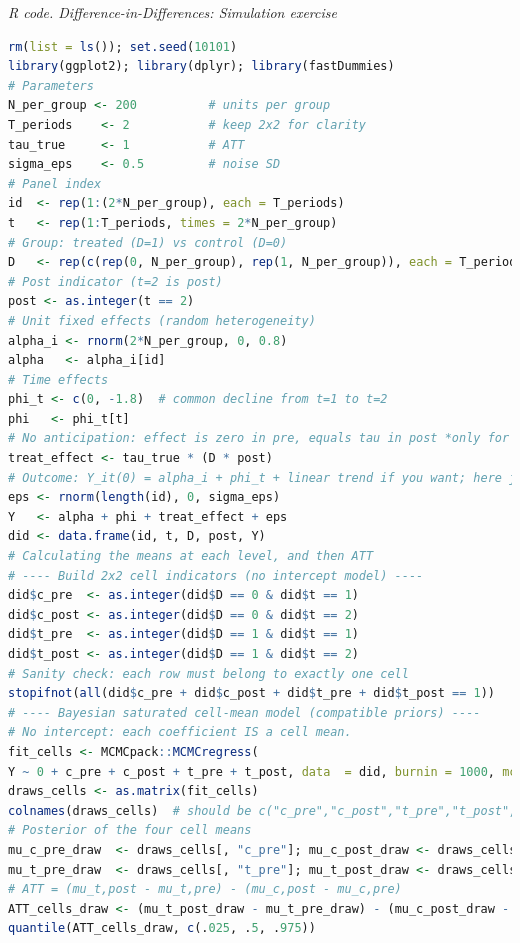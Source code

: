 \begin{enumerate}[leftmargin=*]
\begin{tcolorbox}[enhanced,width=4.67in,center upper,
	fontupper=\large\bfseries,drop shadow southwest,sharp corners]
	\textit{R code. Difference-in-Differences: Simulation exercise}
	\begin{VF}
		\begin{lstlisting}[language=R]
rm(list = ls()); set.seed(10101)
library(ggplot2); library(dplyr); library(fastDummies)
# Parameters
N_per_group <- 200          # units per group
T_periods    <- 2           # keep 2x2 for clarity
tau_true     <- 1           # ATT
sigma_eps    <- 0.5         # noise SD
# Panel index
id  <- rep(1:(2*N_per_group), each = T_periods)
t   <- rep(1:T_periods, times = 2*N_per_group)
# Group: treated (D=1) vs control (D=0)
D   <- rep(c(rep(0, N_per_group), rep(1, N_per_group)), each = T_periods)
# Post indicator (t=2 is post)
post <- as.integer(t == 2)
# Unit fixed effects (random heterogeneity)
alpha_i <- rnorm(2*N_per_group, 0, 0.8)
alpha   <- alpha_i[id]
# Time effects
phi_t <- c(0, -1.8)  # common decline from t=1 to t=2
phi   <- phi_t[t]
# No anticipation: effect is zero in pre, equals tau in post *only for treated*
treat_effect <- tau_true * (D * post)
# Outcome: Y_it(0) = alpha_i + phi_t + linear trend if you want; here just FE + shock
eps <- rnorm(length(id), 0, sigma_eps)
Y   <- alpha + phi + treat_effect + eps
did <- data.frame(id, t, D, post, Y)
# Calculating the means at each level, and then ATT
# ---- Build 2x2 cell indicators (no intercept model) ----
did$c_pre  <- as.integer(did$D == 0 & did$t == 1)
did$c_post <- as.integer(did$D == 0 & did$t == 2)
did$t_pre  <- as.integer(did$D == 1 & did$t == 1)
did$t_post <- as.integer(did$D == 1 & did$t == 2)
# Sanity check: each row must belong to exactly one cell
stopifnot(all(did$c_pre + did$c_post + did$t_pre + did$t_post == 1))
# ---- Bayesian saturated cell-mean model (compatible priors) ----
# No intercept: each coefficient IS a cell mean.
fit_cells <- MCMCpack::MCMCregress(
Y ~ 0 + c_pre + c_post + t_pre + t_post, data  = did, burnin = 1000, mcmc = 10000, thin = 5)
draws_cells <- as.matrix(fit_cells)
colnames(draws_cells)  # should be c("c_pre","c_post","t_pre","t_post", "sigma2")
# Posterior of the four cell means
mu_c_pre_draw  <- draws_cells[, "c_pre"]; mu_c_post_draw <- draws_cells[, "c_post"]
mu_t_pre_draw  <- draws_cells[, "t_pre"]; mu_t_post_draw <- draws_cells[, "t_post"]
# ATT = (mu_t,post - mu_t,pre) - (mu_c,post - mu_c,pre)
ATT_cells_draw <- (mu_t_post_draw - mu_t_pre_draw) - (mu_c_post_draw - mu_c_pre_draw)
quantile(ATT_cells_draw, c(.025, .5, .975))
\end{lstlisting}
	\end{VF}
\end{tcolorbox}  


\end{enumerate}
